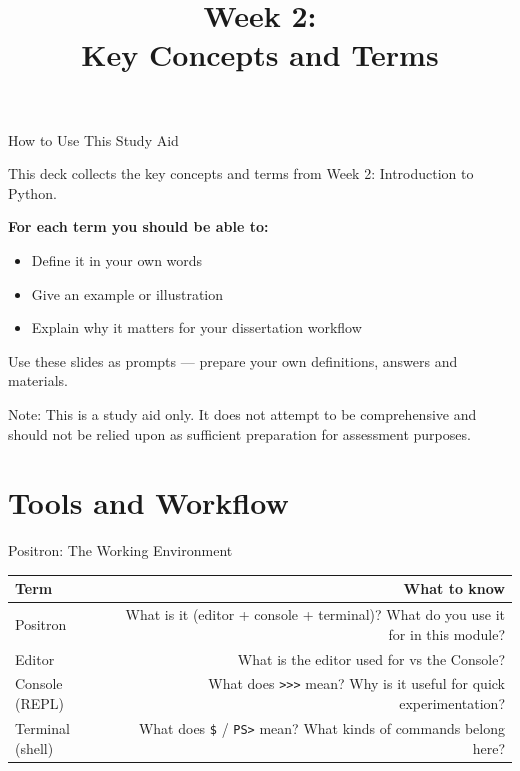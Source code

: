 \documentclass[9pt,aspectratio=169]{beamer}
\title{\LARGE \textnormal{Week 2: \\
Key Concepts and Terms}}
\begin{document}
\begin{frame}[plain]
\titlepage
\end{frame}


\begin{frame}{How to Use This Study Aid}

This deck collects the \alert{key concepts and terms} from Week 2: Introduction to Python.

\medskip

\textbf{For each term you should be able to:}
\begin{itemize}
    \item Define it in your own words
    \item Give an example or illustration
    \item Explain why it matters for your dissertation workflow
\end{itemize}

\medskip

Use these slides as prompts --- prepare your own definitions, answers and materials.

\medskip

\alert{Note:} This is a study aid only. It does not attempt to be comprehensive and should not be relied upon as sufficient preparation for assessment purposes.

\end{frame}


\section{Tools and Workflow}

\begin{frame}{Positron: The Working Environment}

\begin{tabular}{@{}lR@{}}
\toprule
\textbf{Term} & \textbf{What to know} \\
\midrule
\alert{Positron} & What is it (editor + console + terminal)? What do you use it for in this module? \\[0.8em]
\alert{Editor} & What is the editor used for vs the Console? \\[0.8em]
\alert{Console (REPL)} & What does \texttt{>>>} mean? Why is it useful for quick experimentation? \\[0.8em]
\alert{Terminal (shell)} & What does \texttt{\$} / \texttt{PS>} mean? What kinds of commands belong here? \\
\bottomrule
\end{tabular}

\end{frame}
\end{document}
